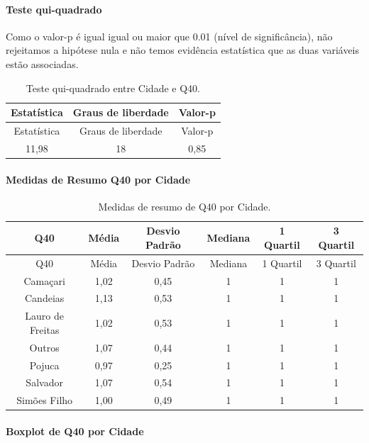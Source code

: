 \documentclass[]{article}
\let\oldparagraph\paragraph
\renewcommand{\paragraph}[1]{\oldparagraph{#1}\mbox{}}
\begin{document}
\hypertarget{teste-qui-quadrado-132}{%
\paragraph{Teste qui-quadrado}\label{teste-qui-quadrado-132}}

Como o valor-p é igual igual ou maior que 0.01 (nível de significância), não rejeitamos a hipótese nula e não temos evidência estatística que as duas variáveis estão associadas.

\begin{longtable}[]{@{}ccc@{}}
\caption{\label{tab:unnamed-chunk-1550}Teste qui-quadrado entre Cidade e Q40.}\tabularnewline
\toprule
Estatística & Graus de liberdade & Valor-p\tabularnewline
\midrule
\endfirsthead
\toprule
Estatística & Graus de liberdade & Valor-p\tabularnewline
\midrule
\endhead
11,98 & 18 & 0,85\tabularnewline
\bottomrule
\end{longtable}

\cleardoublepage

\hypertarget{medidas-de-resumo-q40-por-cidade}{%
\paragraph{Medidas de Resumo Q40 por Cidade}\label{medidas-de-resumo-q40-por-cidade}}

\begin{longtable}[]{@{}cccccc@{}}
\caption{\label{tab:unnamed-chunk-1551}Medidas de resumo de Q40 por Cidade.}\tabularnewline
\toprule
Q40 & Média & Desvio Padrão & Mediana & 1 Quartil & 3 Quartil\tabularnewline
\midrule
\endfirsthead
\toprule
Q40 & Média & Desvio Padrão & Mediana & 1 Quartil & 3 Quartil\tabularnewline
\midrule
\endhead
Camaçari & 1,02 & 0,45 & 1 & 1 & 1\tabularnewline
Candeias & 1,13 & 0,53 & 1 & 1 & 1\tabularnewline
Lauro de Freitas & 1,02 & 0,53 & 1 & 1 & 1\tabularnewline
Outros & 1,07 & 0,44 & 1 & 1 & 1\tabularnewline
Pojuca & 0,97 & 0,25 & 1 & 1 & 1\tabularnewline
Salvador & 1,07 & 0,54 & 1 & 1 & 1\tabularnewline
Simões Filho & 1,00 & 0,49 & 1 & 1 & 1\tabularnewline
\bottomrule
\end{longtable}

\hypertarget{boxplot-de-q40-por-cidade}{%
\paragraph{Boxplot de Q40 por Cidade}\label{boxplot-de-q40-por-cidade}}
\end{document}
